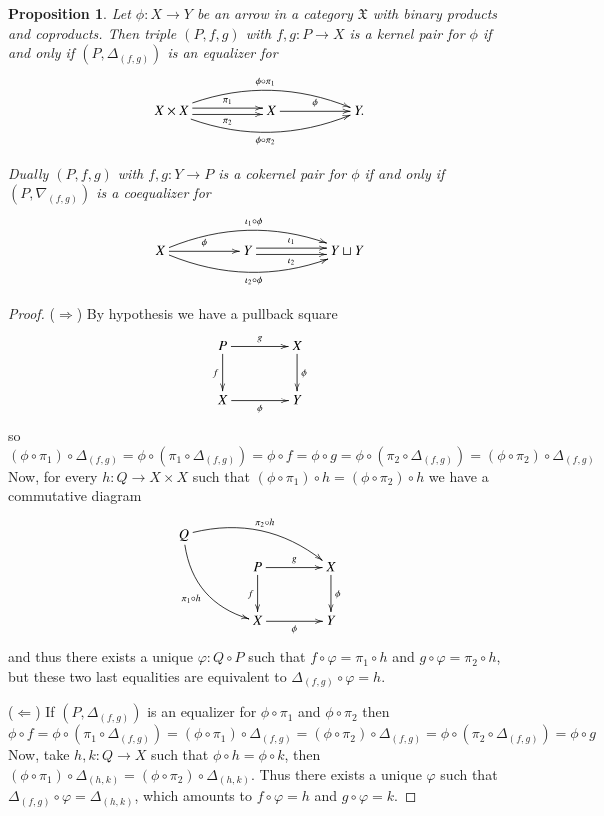 \documentclass[12pt]{article}
\newtheorem{proposition}[lemma]{Proposition}
\theoremstyle{definition}
\def\X{\mathfrak X}
\numberwithin{equation}{section}
\begin{document}
\begin{proposition}\label{kp_equ} Let $\phi:X\rightarrow Y$ be an arrow in a category $\X$ with binary products and coproducts. Then triple $(P, f, g)$ with $f, g:P\rightarrow X$ is a kernel pair for $\phi$ if and only if $(P, \Delta_{(f,g)})$ is an equalizer for
	\[\xymatrix@C=50pt{
		X\times X\ar@<-.5ex>[r]_-{\pi_2} \ar@<.5ex>[r]^-{\pi_1} \ar@/^15pt/[rr]^{\phi\circ\pi_1}\ar@/_15pt/[rr]_{\phi\circ\pi_2}&X\ar[r]^-{\phi}&Y.
	}
	\]
	
	Dually $(P, f, g)$ with $f,g:Y\rightarrow P$ is a cokernel pair for $\phi$ if and only if  $(P,\nabla_{(f,g)})$ is a coequalizer for
\[
\xymatrix@C=50pt{
	X\ar@/^15pt/[rr]^{\iota_1\circ \phi}\ar@/_15pt/[rr]_{\iota_2\circ \phi}\ar[r]^-{\phi}&Y\ar@<-.5ex>[r]_-{\iota_2} \ar@<.5ex>[r]^-{\iota_1}&Y\sqcup Y
}\]
\end{proposition}
\begin{proof}($\Rightarrow$) By hypothesis we have a pullback square
	\[\xymatrix@R=10pt@C=40pt{
		P\ar@{}[ddr]\ar[dd]_{f}\ar[r]^{g}&X\ar[dd]^\phi \\
		\\
		X\ar[r]_\phi &Y
	}\]
	so 
	\[(\phi \circ \pi_1) \circ \Delta_{(f,g)}=\phi \circ (\pi_1\circ \Delta_{(f,g)})=\phi \circ f=\phi \circ g=\phi \circ (\pi_2\circ \Delta_{(f,g)})=(\phi \circ \pi_2) \circ \Delta_{(f,g)} 	\]
	Now, for every $h:Q\rightarrow X\times X$ such that $(\phi \circ \pi_1)\circ h=(\phi \circ \pi_2)\circ h$ we have a commutative diagram
	\[\xymatrix@R=10pt@C=40pt{
		Q\ar@/_-15pt/[rrd]^{\pi_2\circ h}\ar@/_15pt/[rddd]_{\pi_1\circ h}\\
		&P\ar@{}[ddr]\ar[dd]_{f}\ar[r]^{g}&X\ar[dd]^\phi\\
		\\
		&X\ar[r]_\phi&Y
	}\]
	and thus there exists a unique $\varphi:Q\circ P$ such that $f\circ \varphi =\pi_1 \circ h$ and $g\circ \varphi =\pi_2\circ h$, but these two last equalities are equivalent to $\Delta_{(f,g)}\circ \varphi =h$.
	
	\noindent ($\Leftarrow$) If $(P, \Delta_{(f,g)})$ is an equalizer for $\phi \circ \pi_1$ and $\phi \circ \pi_2$ then
	\begin{equation*}\phi \circ f= \phi \circ (\pi_1\circ \Delta_{(f,g)})=(\phi \circ \pi_1)\circ \Delta_{(f,g)}=(\phi \circ \pi_2)\circ \Delta_{(f,g)}=\phi \circ (\pi_2\circ \Delta_{(f,g)})=\phi \circ g
	\end{equation*}
	Now, take $h,k:Q\rightarrow X$ such that $\phi \circ h=\phi \circ k$, then $(\phi \circ \pi_1)\circ \Delta_{(h,k)}=(\phi \circ \pi_2)\circ \Delta_{(h,k)}$. Thus there exists a unique $\varphi$ such that $\Delta_{(f,g)}\circ \varphi=\Delta_{(h,k)}$, which amounts to $f\circ \varphi=h$ and $g\circ \varphi =k$.
\end{proof}
\end{document}
